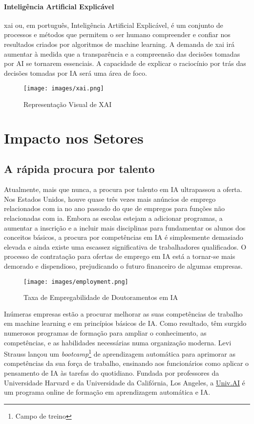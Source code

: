 \documentclass[a4paper, 11pt, onecolumn, oneside]{report}
\begin{document}
\subsubsection{Inteligência Artificial Explicável}
\ac{xai} ou, em português, Inteligência Artificial Explicável, é um conjunto de processos e métodos que permitem o ser humano compreender e confiar nos resultados criados por algoritmos de machine learning. A demanda de \ac{xai} irá aumentar à medida que a transparência e a compreensão das decisões tomadas por AI se tornarem essenciais. A capacidade de explicar o raciocínio por trás das decisões tomadas por IA será uma área de foco.
%
\begin{figure}[ht]
    \centering
    \texttt{[image: images/xai.png]}
    \caption{Representação Visual de XAI \cite{i24}}
    \label{xai}
\end{figure}

%
%
\chapter{Impacto nos Setores}
\label{chap.impacto_setores}

\section{A rápida procura por talento}
Atualmente, mais que nunca, a procura por talento em IA ultrapassou a oferta. Nos Estados Unidos, houve quase três vezes mais anúncios de emprego relacionados com \ac{ia}\cite{ai_jobs} no ano passado do que de empregos para funções não relacionadas com \ac{ia}. Embora as escolas estejam a adicionar programas, a aumentar a inscrição e a incluir mais disciplinas para fundamentar os alunos dos conceitos básicos, a procura por competências em IA é simplesmente demasiado elevada e ainda existe uma escassez significativa de trabalhadores qualificados. O processo de contratação para ofertas de emprego em IA está a tornar-se mais demorado e dispendioso, prejudicando o futuro financeiro de algumas empresas.
%
\begin{figure}[ht]
    \centering
    \texttt{[image: images/employment.png]}
    \caption{Taxa de Empregabilidade de Doutoramentos em IA\cite{i31}}
    \label{employment}
\end{figure}
%
\par
Inúmeras empresas estão a procurar melhorar as suas competências de trabalho em machine learning e em princípios básicos de IA. Como resultado, têm surgido numerosos programas de formação para ampliar o conhecimento, as competências, e as habilidades necessárias numa organização moderna. Levi Strauss lançou um \textit{bootcamp}\footnote{Campo de treino} de aprendizagem automática para aprimorar as competências da sua força de trabalho, ensinando aos funcionários como aplicar o pensamento de IA às tarefas do quotidiano. Fundada por professores da Universidade Harvard e da Universidade da Califórnia, Los Angeles, a \href{https://univ.ai/}{Univ.AI} é um programa online de formação em aprendizagem automática e IA.
\end{document}
